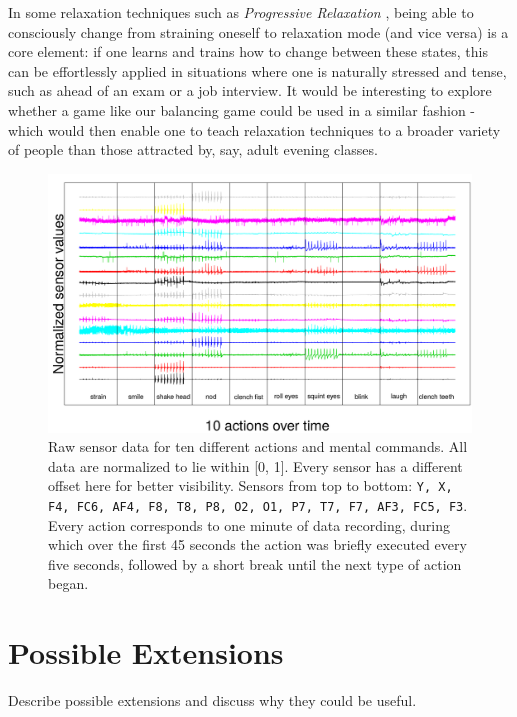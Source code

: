 \documentclass{utue} %
\begin{document}
In some relaxation techniques such as \textit{Progressive Relaxation} \cite{Jacobson1938}, being able to consciously change from straining oneself to relaxation mode (and vice versa) is a core element: if one learns and trains how to change between these states, this can be effortlessly applied in situations where one is naturally stressed and tense, such as ahead of an exam or a job interview. It would be interesting to explore whether a game like our balancing game could be used in a similar fashion - which would then enable one to teach relaxation techniques to a broader variety of people than those attracted by, say, adult evening classes.




\begin{figure}[h!]
	\centering
	\includegraphics[width=1.0\textwidth]{images/sensor_values.png}
	\caption{Raw sensor data for ten different actions and mental commands. All data are normalized to lie within [0, 1]. Every sensor has a different offset here for better visibility. Sensors from top to bottom: \texttt{Y, X, F4, FC6, AF4, F8, T8, P8, O2, O1, P7, T7, F7, AF3, FC5, F3}. Every action corresponds to one minute of data recording, during which over the first 45 seconds the action was briefly executed every five seconds, followed by a short break until the next type of action began.}
	\label{fig:sensor_values}
\end{figure}

\section{Possible Extensions}

Describe possible extensions and discuss why they could be useful.
\end{document}
